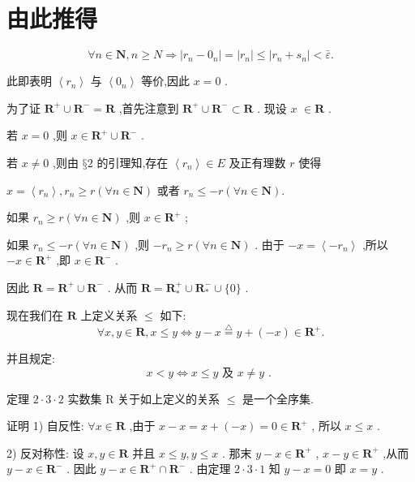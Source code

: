 \section*{由此推得}
$$\forall n \in  \mathbf{N},n \geq  N \Rightarrow  \left| {{r}_{n} - {0}_{n}}\right|  = \left| {r}_{n}\right|  \leq  \left| {{r}_{n} + {s}_{n}}\right|  < \bar{\varepsilon }.$$

此即表明 $\left\langle  {r}_{n}\right\rangle$ 与 $\left\langle  {0}_{n}\right\rangle$ 等价,因此 $x = 0$ .

为了证 ${\mathbf{R}}^{ + } \cup  {\mathbf{R}}^{ - } = \mathbf{R}$ ,首先注意到 ${\mathbf{R}}^{ + } \cup  {\mathbf{R}}^{ - } \subset  \mathbf{R}$ . 现设 $x$  $\in  \mathbf{R}$ .

若 $x = 0$ ,则 $x \in  {\mathbf{R}}^{ + } \cup  {\mathbf{R}}^{ - }$ .

若 $x \neq  0$ ,则由 $§2$ 的引理知,存在 $\left\langle  {r}_{n}\right\rangle   \in  E$ 及正有理数 $r$ 使得

$x = \left\langle  {r}_{n}\right\rangle  ,{r}_{n} \geq  r\left( {\forall n \in  \mathbf{N}}\right)$ 或者 ${r}_{n} \leq   - r\left( {\forall n \in  \mathbf{N}}\right) .$

如果 ${r}_{n} \geq  r\left( {\forall n \in  \mathbf{N}}\right)$ ,则 $x \in  {\mathbf{R}}^{ + }$ ;

如果 ${r}_{n} \leq   - r\left( {\forall n \in  \mathbf{N}}\right)$ ,则 $- {r}_{n} \geq  r\left( {\forall n \in  \mathbf{N}}\right)$ . 由于 $- x = \left\langle  {-{r}_{n}}\right\rangle$ ,所以 $- x \in  {\mathbf{R}}^{ + }$ ,即 $x \in  {\mathbf{R}}^{ - }$ .

因此 $\mathbf{R} = {\mathbf{R}}^{ + } \cup  {\mathbf{R}}^{ - }$ . 从而 $\mathbf{R} = {\mathbf{R}}_{ * }^{ + } \cup  {\mathbf{R}}_{ * }^{ - } \cup  \{ 0\}$ .

现在我们在 $\mathbf{R}$ 上定义关系 $\leq$ 如下:
$$\forall x,y \in  \mathbf{R},x \leq  y \Leftrightarrow  y - x\overset{ \bigtriangleup  }{ = }y + \left( {-x}\right)  \in  {\mathbf{R}}^{ + }.$$

并且规定:
$$x < y \Leftrightarrow  x \leq  y\text{ 及 }x \neq  y\text{ . }$$

定理 $2 \cdot  3 \cdot  2$ 实数集 $\mathrm{R}$ 关于如上定义的关系 $\leq$ 是一个全序集.

证明 1) 自反性: $\forall x \in  \mathbf{R}$ ,由于 $x - x = x + \left( {-x}\right)  = 0 \in  {\mathbf{R}}^{ + }$ , 所以 $x \leq  x$ .

2) 反对称性: 设 $x,y \in  \mathbf{R}$ 并且 $x \leq  y,y \leq  x$ . 那末 $y - x \in  {\mathbf{R}}^{ + }$ , $x - y \in  {\mathbf{R}}^{ + }$ ,从而 $y - x \in  {\mathbf{R}}^{ - }$ . 因此 $y - x \in  {\mathbf{R}}^{ + } \cap  {\mathbf{R}}^{ - }$ . 由定理 $2 \cdot  3 \cdot  1$ 知 $y - x = 0$ 即 $x = y$ .

